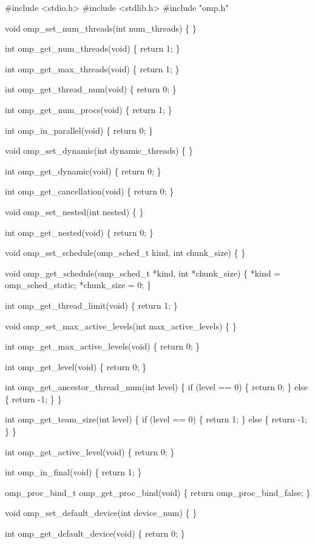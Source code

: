 {\small \begin{codepar}
\#include <stdio.h>
\#include <stdlib.h>
\#include "omp.h"

void omp\_set\_num\_threads(int num\_threads)
\{
\}

int omp\_get\_num\_threads(void)
\{
    return 1;
\}

int omp\_get\_max\_threads(void)
\{
    return 1;
\}

int omp\_get\_thread\_num(void)
\{
    return 0;
\}

int omp\_get\_num\_procs(void)
\{
    return 1;
\}

int omp\_in\_parallel(void)
\{
    return 0;
\}

void omp\_set\_dynamic(int dynamic\_threads)
\{
\}

int omp\_get\_dynamic(void)
\{
    return 0;
\}

int omp\_get\_cancellation(void)
\{
    return 0;
\}

void omp\_set\_nested(int nested)
\{
\}

int omp\_get\_nested(void)
\{
    return 0;
\}

void omp\_set\_schedule(omp\_sched\_t kind, int chunk\_size)
\{
\}

void omp\_get\_schedule(omp\_sched\_t *kind, int *chunk\_size)
\{
    *kind = omp\_sched\_static;
    *chunk\_size = 0;
\}

int omp\_get\_thread\_limit(void)
\{
    return 1;
\}

void omp\_set\_max\_active\_levels(int max\_active\_levels)
\{
\}

int omp\_get\_max\_active\_levels(void)
\{
    return 0;
\}

int omp\_get\_level(void)
\{
    return 0;
\}

int omp\_get\_ancestor\_thread\_num(int level)
\{
    if (level == 0)
    \{
        return 0;
    \}
    else
    \{
        return -1;
    \}
\}

int omp\_get\_team\_size(int level)
\{
    if (level == 0)
    \{
        return 1;
    \}
    else
    \{
        return -1;
    \}
\}

int omp\_get\_active\_level(void)
\{
    return 0;
\}

int omp\_in\_final(void)
\{
    return 1;
\}

omp\_proc\_bind\_t omp\_get\_proc\_bind(void) 
\{
    return omp\_proc\_bind\_false;
\}

void omp\_set\_default\_device(int device\_num)
\{
\}

int omp\_get\_default\_device(void)
\{
    return 0;
\}


\end{codepar}}

